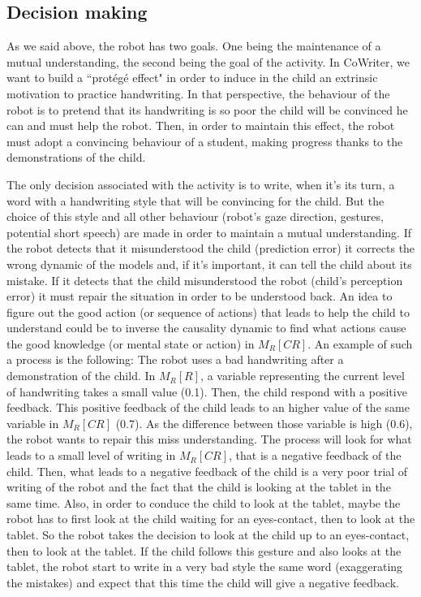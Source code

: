 \documentclass[10pt,a4paper]{article}
\begin{document}
\subsection{Decision making}
\label{ssec:decision}

As we said above, the robot has two goals. One being the maintenance of a mutual understanding, the second being the goal of the activity. In CoWriter, we want to build a ``prot\'eg\'e effect" in order to induce in the child an extrinsic motivation to practice handwriting. In that perspective, the behaviour of the robot is to pretend that its handwriting is so poor the child will be convinced he can and must help the robot. Then, in order to maintain this effect, the robot must adopt a convincing behaviour of a student, making progress thanks to the demonstrations of the child. 

The only decision associated with the activity is to write, when it's its turn, a word with a handwriting style that will be convincing for the child. But the choice of this style and all other behaviour (robot's gaze direction, gestures, potential short speech) are made in order to maintain a mutual understanding. If the robot detects that it misunderstood the child (prediction error) it corrects the wrong dynamic of the models and, if it's important, it can tell the child about its mistake. If it detects that the child misunderstood the robot (child's perception error) it must repair the situation in order to be understood back. An idea to figure out the good action (or sequence of actions) that leads to help the child to understand could be to inverse the causality dynamic to find what actions cause the good knowledge (or mental state or action) in $M_R\left[CR\right]$. An example of such a process is the following: The robot uses a bad handwriting after a demonstration of the child. In $M_R\left[R\right]$, a variable representing the current level of handwriting takes a small value (0.1). Then, the child respond with a positive feedback. This positive feedback of the child leads to an higher value of the same variable in $M_R\left[CR\right]$ (0.7). As the difference between those variable is high (0.6), the robot wants to repair this miss understanding. The process will look for what leads to a small level of writing in $M_R\left[CR\right]$, that is a negative feedback of the child. Then, what leads to a negative feedback of the child is a very poor trial of writing of the robot and the fact that the child is looking at the tablet in the same time. Also, in order to conduce the child to look at the tablet, maybe the robot has to first look at the child waiting for an eyes-contact, then to look at the tablet. So the robot takes the decision to look at the child up to an eyes-contact, then to look at the tablet. If the child follows this gesture and also looks at the tablet, the robot start to write in a very bad style the same word (exaggerating the mistakes) and expect that this time the child will give a negative feedback.
\end{document}
